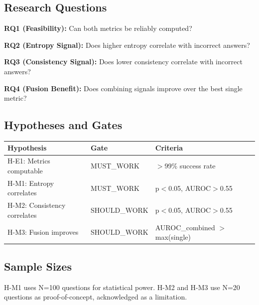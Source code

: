 \subsection{Research Questions}

\textbf{RQ1 (Feasibility):} Can both metrics be reliably computed?

\textbf{RQ2 (Entropy Signal):} Does higher entropy correlate with incorrect answers?

\textbf{RQ3 (Consistency Signal):} Does lower consistency correlate with incorrect answers?

\textbf{RQ4 (Fusion Benefit):} Does combining signals improve over the best single metric?

\subsection{Hypotheses and Gates}

\begin{table}[h]
\centering
\begin{tabular}{lll}
\toprule
\textbf{Hypothesis} & \textbf{Gate} & \textbf{Criteria} \\
\midrule
H-E1: Metrics computable & MUST\_WORK & $>$99\% success rate \\
H-M1: Entropy correlates & MUST\_WORK & p$<$0.05, AUROC$>$0.55 \\
H-M2: Consistency correlates & SHOULD\_WORK & p$<$0.05, AUROC$>$0.55 \\
H-M3: Fusion improves & SHOULD\_WORK & AUROC\_combined $>$ max(single) \\
\bottomrule
\end{tabular}
\end{table}

\subsection{Sample Sizes}

H-M1 uses N=100 questions for statistical power. H-M2 and H-M3 use N=20 questions as proof-of-concept, acknowledged as a limitation.
